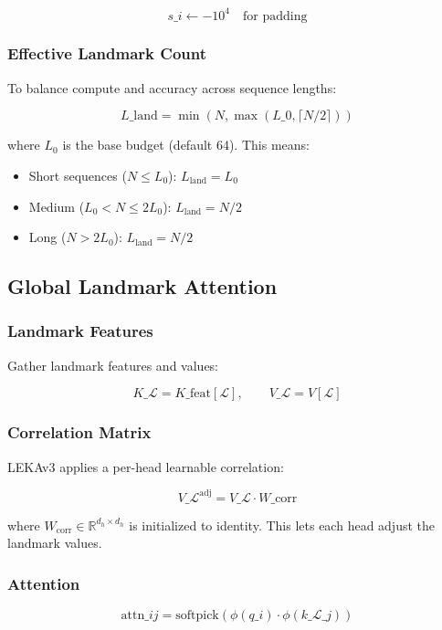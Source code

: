 \[
s\_i \leftarrow -10^4 \quad \text{for padding}
\tag{4.5}
\]

\subsubsection{Effective Landmark Count}

To balance compute and accuracy across sequence lengths:

\[
L\_\text{land} = \min(N, \max(L\_0, \lceil N/2 \rceil))
\tag{4.6}
\]

where $L_0$ is the base budget (default 64). This means:
\begin{itemize}
\item Short sequences ($N \leq L_0$): $L_\text{land} = L_0$
\item Medium ($L_0 < N \leq 2 L_0$): $L_\text{land} = N/2$
\item Long ($N > 2 L_0$): $L_\text{land} = N/2$

\end{itemize}
\subsection{Global Landmark Attention}

\subsubsection{Landmark Features}

Gather landmark features and values:

\[
K\_\mathcal{L} = K\_\text{feat}[\mathcal{L}], \qquad V\_\mathcal{L} = V[\mathcal{L}]
\tag{4.7}
\]

\subsubsection{Correlation Matrix}

LEKAv3 applies a per-head learnable correlation:

\[
V\_\mathcal{L}^\text{adj} = V\_\mathcal{L} \cdot W\_\text{corr}
\tag{4.8}
\]

where $W_\text{corr} \in \mathbb{R}^{d_h \times d_h}$ is initialized to 
identity. This lets each head adjust the landmark values.

\subsubsection{Attention}

\[
\text{attn}\_{ij} = \text{softpick}\!\left(\phi(q\_i) \cdot \phi(k\_{\mathcal{L}\_j})\right)
\tag{4.9}
\]

